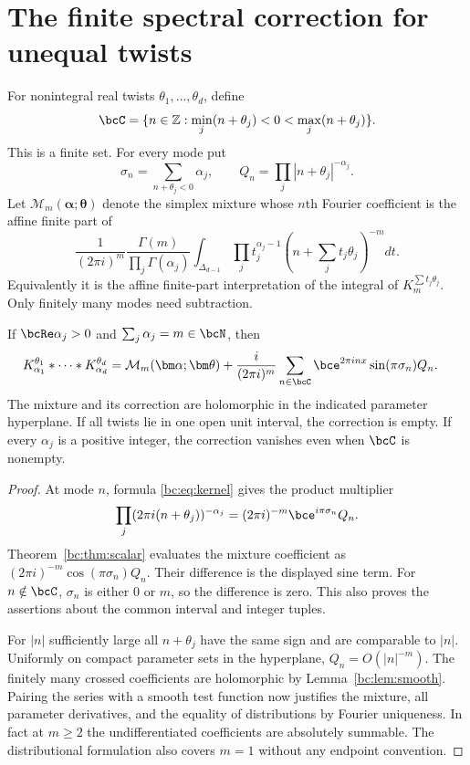 \section{The finite spectral correction for unequal twists}
\label{bc:sec:periodic}

For nonintegral real twists $\theta_1,\ldots,\theta_d$, define
\begin{equation}\label{bc:eq:crossed-modes}
 \bcC=\{n\in\mathbb Z:\min_j(n+\theta_j)<0<\max_j(n+\theta_j)\}.
\end{equation}
This is a finite set. For every mode put
\[
 \sigma_n=\sum_{n+\theta_j<0}\alpha_j,
 \qquad Q_n=\prod_j|n+\theta_j|^{-\alpha_j}.
\]
Let $\mathcal M_m(\bm\alpha;\bm\theta)$ denote the simplex mixture whose
$n$th Fourier coefficient is the affine finite part of
\[
 \frac1{(2\pi i)^m}
 \frac{\Gamma(m)}{\prod_j\Gamma(\alpha_j)}
 \int_{\Delta_{d-1}}\prod_jt_j^{\alpha_j-1}
                     \left(n+\sum_jt_j\theta_j\right)^{-m}dt.
\]
Equivalently it is the affine finite-part interpretation of the integral
of $K_m^{\sum t_j\theta_j}$. Only finitely many modes need subtraction.

\begin{theorem}
\label{bc:thm:periodic}
If $\bcRe\alpha_j>0$ and $\sum_j\alpha_j=m\in\bcN$, then
\begin{align}
 K_{\alpha_1}^{\theta_1}*\cdots*K_{\alpha_d}^{\theta_d}
 ={}&\mathcal M_m(\bm\alpha;\bm\theta)
 +\frac{i}{(2\pi i)^m}\sum_{n\in\bcC}
      \bce^{2\pi i n x}\sin(\pi\sigma_n)Q_n.
 \label{bc:eq:periodic-main}
\end{align}
The mixture and its correction are holomorphic in the indicated
parameter hyperplane. If all twists lie in one open unit interval, the
correction is empty. If every $\alpha_j$ is a positive integer, the
correction vanishes even when $\bcC$ is nonempty.
\end{theorem}
\begin{proof}
At mode $n$, formula \eqref{bc:eq:kernel} gives the product multiplier
\begin{equation}\label{bc:eq:mode-phase}
 \prod_j(2\pi i(n+\theta_j))^{-\alpha_j}
       =(2\pi i)^{-m}\bce^{i\pi\sigma_n}Q_n.
\end{equation}
Theorem~\ref{bc:thm:scalar} evaluates the mixture coefficient as
$(2\pi i)^{-m}\cos(\pi\sigma_n)Q_n$. Their difference is the displayed
sine term. For $n\notin\bcC$, $\sigma_n$ is either $0$ or $m$, so the
difference is zero. This also proves the assertions about the common
interval and integer tuples.

For $|n|$ sufficiently large all $n+\theta_j$ have the same sign and are
comparable to $|n|$. Uniformly on compact parameter sets in the
hyperplane, $Q_n=O(|n|^{-m})$. The finitely many crossed coefficients
are holomorphic by Lemma~\ref{bc:lem:smooth}. Pairing the series with a
smooth test function now justifies the mixture, all parameter
derivatives, and the equality of distributions by Fourier uniqueness.
In fact at $m\ge2$ the undifferentiated coefficients are absolutely
summable. The distributional formulation also covers $m=1$ without any
endpoint convention.
\end{proof}

